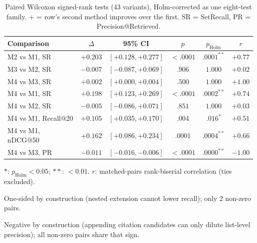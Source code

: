 \documentclass[sigconf,screen]{acmart}
\begin{document}
\begin{table}[t]
\centering
\small
\setlength{\tabcolsep}{2.6pt}
\begin{threeparttable}
\caption{Paired Wilcoxon signed-rank tests (43 variants), Holm-corrected
as one eight-test family. $+$ = row's second method improves over the
first. SR = SetRecall, PR = Precision@Retrieved.}
\label{tab:significance}
\footnotesize
\begin{tabular}{@{}lccccc@{}}
\toprule
Comparison & $\Delta$ & 95\% CI & $p$ & $p_{\text{Holm}}$ & $r$ \\
\midrule
M2 vs M1, SR & $+0.203$ & $[+0.128, +0.277]$ & $<.0001$ & $.0001^{**}$ & $+0.77$ \\
M3 vs M2, SR & $-0.007$ & $[-0.087, +0.069]$ & $.906$ & $1.000$ & $+0.02$ \\
M4 vs M3, SR\tnote{a} & $+0.002$ & $[+0.000, +0.004]$ & $.500$ & $1.000$ & $+1.00$ \\
M4 vs M1, SR & $+0.198$ & $[+0.123, +0.269]$ & $<.0001$ & $.0002^{**}$ & $+0.74$ \\
M4 vs M2, SR & $-0.005$ & $[-0.086, +0.071]$ & $.851$ & $1.000$ & $+0.03$ \\
M4 vs M1, Recall@20 & $+0.105$ & $[+0.035, +0.170]$ & $.004$ & $.016^{*}$ & $+0.51$ \\
M4 vs M1, nDCG@50 & $+0.162$ & $[+0.086, +0.234]$ & $.0001$ & $.0004^{**}$ & $+0.66$ \\
M4 vs M3, PR\tnote{b} & $-0.011$ & $[-0.016, -0.006]$ & $<.0001$ & $.0000^{**}$ & $-1.00$ \\
\bottomrule
\end{tabular}
\begin{tablenotes}
\item $*$: $p_{\text{Holm}}<0.05$; $**$: $<0.01$. $r$: matched-pairs
rank-biserial correlation (ties excluded).
\item[a] One-sided by construction (nested extension cannot lower
recall); only 2 non-zero pairs.
\item[b] Negative by construction (appending citation candidates can only
dilute list-level precision); all non-zero pairs share that sign.
\end{tablenotes}
\end{threeparttable}
\end{table}
\end{document}
